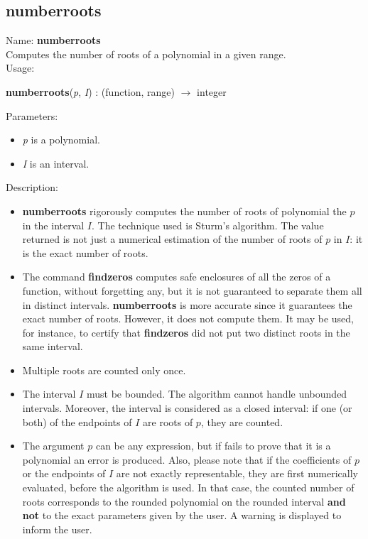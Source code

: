 \subsection{numberroots}
\label{labnumberroots}
\noindent Name: \textbf{numberroots}\\
Computes the number of roots of a polynomial in a given range.\\
\noindent Usage: 
\begin{center}
\textbf{numberroots}(\emph{p}, \emph{I}) : (\textsf{function}, \textsf{range}) $\rightarrow$ \textsf{integer}\\
\end{center}
Parameters: 
\begin{itemize}
\item \emph{p} is a polynomial.
\item \emph{I} is an interval.
\end{itemize}
\noindent Description: \begin{itemize}

\item \textbf{numberroots} rigorously computes the number of roots of polynomial the $p$ in
   the interval $I$. The technique used is Sturm's algorithm. The value returned
   is not just a numerical estimation of the number of roots of $p$ in $I$: it is
   the exact number of roots.

\item The command \textbf{findzeros} computes safe enclosures of all the zeros of a
   function, without forgetting any, but it is not guaranteed to separate them
   all in distinct intervals. \textbf{numberroots} is more accurate since it guarantees 
   the exact number of roots. However, it does not compute them. It may be used,
   for instance, to certify that \textbf{findzeros} did not put two distinct roots in 
   the same interval.

\item Multiple roots are counted only once.

\item The interval $I$ must be bounded. The algorithm cannot handle unbounded
   intervals. Moreover, the interval is considered as a closed interval: if one
   (or both) of the endpoints of $I$ are roots of $p$, they are counted.

\item The argument $p$ can be any expression, but if \sollya fails to prove that
   it is a polynomial an error is produced. Also, please note that if the
   coefficients of $p$ or the endpoints of $I$ are not exactly representable,
   they are first numerically evaluated, before the algorithm is used. In that
   case, the counted number of roots corresponds to the rounded polynomial on
   the rounded interval \textbf{and not} to the exact parameters given by the user.
   A warning is displayed to inform the user.
\end{itemize}
